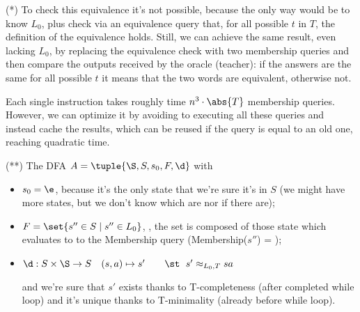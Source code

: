 \documentclass[oneside]{academica}
\begin{document}
\bigskip
(*) To check this equivalence it's not possible, because the only way would be to know $L_0$, plus check via an equivalence query that, for all possible $t$ in $T$, the definition of the equivalence holds.
Still, we can achieve the same result, even lacking $L_0$, by replacing the equivalence check with two membership queries and then compare the outputs received by the oracle (teacher): if the answers are the same for all possible $t$ it means that the two words are equivalent, otherwise not.

\bigskip
Each single instruction takes roughly time $n^3 \cdot \abs{T}$ membership queries.
However, we can optimize it by avoiding to executing all these queries and instead cache the results, which can be reused if the query is equal to an old one, reaching quadratic time.

\bigskip
(**) The DFA $A = \tuple{\S,S,s_0,F,\d}$ with
\begin{itemize}
  \item $s_0 = \e$, because it's the only state that we're sure it's in $S$ (we might have more states, but we don't know which are nor if there are);
  \item $F = \set{s'' \in S \mid s'' \in L_0}$, \ie, the set is composed of those state which evaluates to \true to the Membership query (Membership($s''$) = \true);
  \item $\d : S \times \S \to S \quad (s,a) \mapsto s' \qquad\text{\st } \; s' \approx_{L_0,T} sa$

    and we're sure that $s'$ exists thanks to T-completeness (after completed while loop) and it's unique thanks to T-minimality (already before while loop).
\end{itemize}
\end{document}

